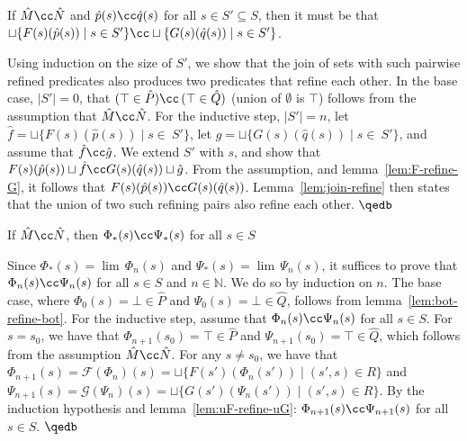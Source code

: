 \begin{lemma} \label{lem:uF-refine-uG}
If $\hat M \cc \hat N$ and $\hat p(s) \cc \hat q(s)$ for all $s \in S' \subseteq S$, then it must be that $\sqcup \{ F(s)(\hat p(s)) \mid s \in S' \} \cc \sqcup \{ G(s)(\hat q(s)) \mid s \in S' \}$.
\end{lemma}

Using induction on the size of $S'$, we show that the join of sets with such pairwise refined predicates also produces two predicates that refine each other. In the base case, $| S' | = 0$, that $(\top \in \hat P) \cc \, (\top \in \hat Q)$ (union of $\emptyset$ is $\top$) follows from the assumption that $\hat M \cc \hat N$. For the inductive step, $| S' | = n$, let $\hat f = \sqcup \{ F(s)(\hat p(s)) \mid s \in \: S' \}$, let $\hat g = \sqcup \{ G(s)(\hat q(s)) \mid s \in \: S' \}$, and assume that $\hat f \cc \hat g$. We extend $S'$ with $s$, and show that $F(s)(\hat p(s)) \sqcup \hat f \cc G(s)(\hat q(s)) \sqcup \hat g$. From the assumption, and lemma~\ref{lem:F-refine-G}, it follows that $F(s)(\hat p(s)) \cc G(s)(\hat q(s))$. Lemma~\ref{lem:join-refine} then states that the union of two such refining pairs also refine each other. $\qedb$


\begin{lemma} \label{lem:Phi-refine-Psi}
If $\hat M \cc \hat N$, then $\Phi_{*}(s) \cc \Psi_{*}(s)$ for all $s \in S$
\end{lemma}

Since $\Phi_{*}(s) = \lim \, \Phi_{n}(s)$ and $\Psi_{*}(s) = \lim \, \Psi_{n}(s)$, it suffices to prove that $\Phi_{n}(s) \cc \Psi_{n}(s)$ for all $s \in S$ and $n \in \mathbb{N}$. We do so by induction on $n$. The base case, where $\Phi_{0}(s) = \bot \in \hat P$ and $\Psi_{0}(s) = \bot \in \hat Q$, follows from lemma~\ref{lem:bot-refine-bot}. For the inductive step, assume that $\Phi_{n}(s) \cc \Psi_{n}(s)$ for all $s \in S$. For $s = s_{0}$, we have that $\Phi_{n+1}(s_{0}) = \top \in \hat P$ and $\Psi_{n+1}(s_{0}) = \top \in \hat Q$, which follows from the assumption $\hat M \cc \hat N$. For any $s \neq s_{0}$, we have that $\Phi_{n+1}(s) = \mathcal{F}(\Phi_{n})(s) = \sqcup \{ F(s')(\Phi_{n}(s')) \mid (s',s) \in R \}$ and $\Psi_{n+1}(s) = \mathcal{G}(\Psi_{n})(s) = \sqcup \{ G(s')(\Psi_{n}(s')) \mid (s',s) \in R \}$. By the induction hypothesis and lemma~\ref{lem:uF-refine-uG}: $\Phi_{n+1}(s) \cc \Psi_{n+1}(s)$ for all $s \in S$. $\qedb$


